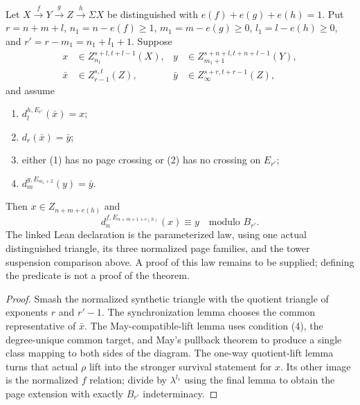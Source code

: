 \begin{theorem}
  \label{thm:generalized-mahowald}
  \notready
  Let
  $X\xrightarrow fY\xrightarrow gZ\xrightarrow h\Sigma X$ be distinguished
  with $e(f)+e(g)+e(h)=1$.  Put
  $r=n+m+l$, $n_1=n-e(f)\ge1$,
  $m_1=m-e(g)\ge0$, $l_1=l-e(h)\ge0$, and
  $r'=r-m_1=n_1+l_1+1$.  Suppose
  \[
  \begin{aligned}
    x&\in Z_{n_1}^{s+l,t+l-1}(X),&
    y&\in Z_{m_1+1}^{s+n+l,t+n+l-1}(Y),\\
    \bar x&\in Z_{r-1}^{s,t}(Z),&
    \bar y&\in Z_\infty^{s+r,t+r-1}(Z),
  \end{aligned}
  \]
  and assume
  \begin{enumerate}
    \item $d_l^{h,E_{r'}}(\bar x)=x$;
    \item $d_r(\bar x)=\bar y$;
    \item either (1) has no page crossing or (2) has no crossing on $E_{r'}$;
    \item $d_m^{g,E_{m_1+2}}(y)=\bar y$.
  \end{enumerate}
  Then $x\in Z_{n+m+e(h)}$ and
  \[
    d_n^{f,E_{n+m+1+e(h)}}(x)
       \equiv y\quad\text{modulo }B_{r'}.
  \]
  The linked Lean declaration is the parameterized law, using one actual
  distinguished triangle, its three normalized page families, and the
  tower suspension comparison above. A proof of this law remains to be
  supplied; defining the predicate is not a proof of the theorem.
\end{theorem}

\begin{proof}
  Smash the normalized synthetic triangle with the quotient triangle of
  exponents $r$ and $r'-1$.  The synchronization lemma chooses the common
  representative of $\bar x$.  The May-compatible-lift lemma uses condition
  (4), the degree-unique common target, and May's pullback theorem to produce a
  single class mapping to both sides of the diagram.  The one-way
  quotient-lift lemma turns that actual $\rho$ lift into the stronger survival
  statement for $x$.  Its other image is the normalized $f$ relation; divide
  by $\lambda^{l_1}$ using the final lemma to obtain the page extension with
  exactly $B_{r'}$ indeterminacy.
\end{proof}

